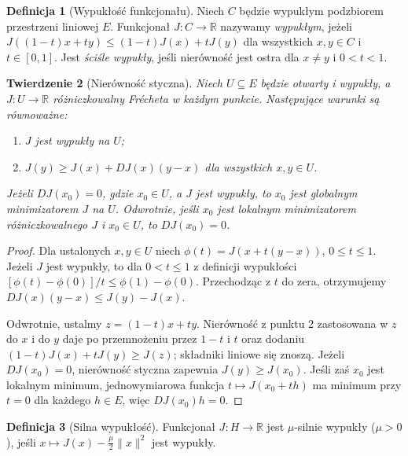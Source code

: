 \documentclass[11pt,a4paper]{article}
\numberwithin{equation}{section}
\theoremstyle{plain}
\newtheorem{twierdzenie}{Twierdzenie}[section]
\theoremstyle{definition}
\newtheorem{definicja}[twierdzenie]{Definicja}
\theoremstyle{remark}
\newcommand{\R}{\mathbb R}
\begin{document}
\begin{definicja}[Wypukłość funkcjonału]
\label{def:convex-fun16}
Niech $C$ będzie wypukłym podzbiorem przestrzeni liniowej $E$.
Funkcjonał $J:C\to\R$ nazywamy \emph{wypukłym}, jeżeli
$J((1-t)x+ty)\le(1-t)J(x)+tJ(y)$ dla wszystkich $x,y\in C$
i $t\in[0,1]$. Jest \emph{ściśle wypukły}, jeśli nierówność
jest ostra dla $x\ne y$ i $0<t<1$.
\end{definicja}

\begin{twierdzenie}[Nierówność styczna]
\label{thm:convex-derivative16}
Niech $U\subseteq E$ będzie otwarty i wypukły, a
$J:U\to\R$ różniczkowalny Frécheta w każdym punkcie.
Następujące warunki są równoważne:
\begin{enumerate}
\item $J$ jest wypukły na $U$;
\item $J(y)\ge J(x)+DJ(x)(y-x)$ dla wszystkich $x,y\in U$.
\end{enumerate}
Jeżeli $DJ(x_0)=0$, gdzie $x_0\in U$, a $J$ jest wypukły,
to $x_0$ jest globalnym minimizatorem $J$ na $U$.
Odwrotnie, jeśli $x_0$ jest lokalnym minimizatorem
różniczkowalnego $J$ i $x_0\in U$, to $DJ(x_0)=0$.
\end{twierdzenie}
\begin{proof}
Dla ustalonych $x,y\in U$ niech
$\phi(t)=J(x+t(y-x))$, $0\le t\le1$.
Jeżeli $J$ jest wypukły, to dla $0<t\le1$
z definicji wypukłości
$[\phi(t)-\phi(0)]/t\le\phi(1)-\phi(0)$.
Przechodząc z $t$ do zera, otrzymujemy
$DJ(x)(y-x)\le J(y)-J(x)$.

Odwrotnie, ustalmy $z=(1-t)x+ty$.
Nierówność z punktu 2 zastosowana w $z$ do $x$ i do $y$
daje po przemnożeniu przez $1-t$ i $t$ oraz dodaniu
$(1-t)J(x)+tJ(y)\ge J(z)$; składniki liniowe się znoszą.
Jeżeli $DJ(x_0)=0$, nierówność styczna zapewnia
$J(y)\ge J(x_0)$. Jeśli zaś $x_0$ jest lokalnym minimum,
jednowymiarowa funkcja $t\mapsto J(x_0+th)$ ma minimum
przy $t=0$ dla każdego $h\in E$, więc $DJ(x_0)h=0$.
\end{proof}

\begin{definicja}[Silna wypukłość]
\label{def:strong-convex16}
Funkcjonał $J:H\to\R$ jest $\mu$-silnie wypukły
($\mu>0$), jeśli $x\mapsto J(x)-\frac\mu2\|x\|^2$
jest wypukły.
\end{definicja}
\end{document}
